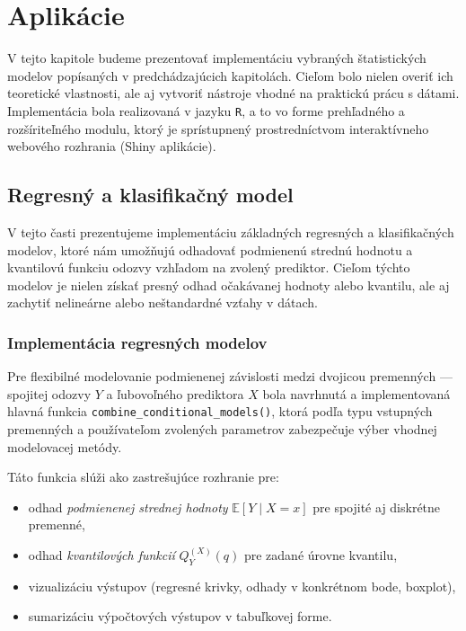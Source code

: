 \chapter{Aplikácie}\label{chap:applications}

V tejto kapitole budeme prezentovať implementáciu vybraných štatistických modelov popísaných v predchádzajúcich kapitolách. Cieľom bolo nielen overiť ich teoretické vlastnosti, ale aj vytvoriť nástroje vhodné na praktickú prácu s dátami. Implementácia bola realizovaná v jazyku \texttt{R}, a to vo forme prehľadného a rozšíriteľného modulu, ktorý je sprístupnený prostredníctvom interaktívneho webového rozhrania (Shiny aplikácie).

\section{Regresný a klasifikačný model}\label{sec:app_regression_class}

V tejto časti prezentujeme implementáciu základných regresných a klasifikačných modelov, ktoré nám umožňujú odhadovať podmienenú strednú hodnotu a kvantilovú funkciu odozvy vzhľadom na zvolený prediktor. Cieľom týchto modelov je nielen získať presný odhad očakávanej hodnoty alebo kvantilu, ale aj zachytiť nelineárne alebo neštandardné vzťahy v dátach.

\subsection{Implementácia regresných modelov}\label{subsec:regression_implementation}

Pre flexibilné modelovanie podmienenej závislosti medzi dvojicou premenných — spojitej odozvy $Y$ a ľubovoľného prediktora $X$ bola navrhnutá a implementovaná hlavná funkcia \texttt{combine\_conditional\_models()}, ktorá podľa typu vstupných premenných a používateľom zvolených parametrov zabezpečuje výber vhodnej modelovacej metódy.

Táto funkcia slúži ako zastrešujúce rozhranie pre:
\begin{itemize}
  \item odhad \textit{podmienenej strednej hodnoty} $\mathbb{E}[Y \mid X = x]$ pre spojité aj diskrétne premenné,
  \item odhad \textit{kvantilových funkcií} $Q_Y^{(X)}(q)$ pre zadané úrovne kvantilu,
  \item vizualizáciu výstupov (regresné krivky, odhady v konkrétnom bode, boxplot),
  \item sumarizáciu výpočtových výstupov v tabuľkovej forme.
\end{itemize}


